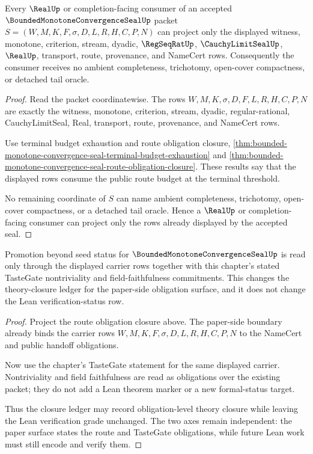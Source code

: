 \begin{theorem}
\label{thm:bounded-monotone-convergence-seal-threshold-route-exhaustion}
Every $\RealUp$ or completion-facing consumer of an accepted $\BoundedMonotoneConvergenceSealUp$ packet $S=(W,M,K,F,\sigma,D,L,R,H,C,P,N)$ can project only the displayed witness, monotone, criterion, stream, dyadic, $\RegSeqRatUp$, $\CauchyLimitSealUp$, $\RealUp$, transport, route, provenance, and NameCert rows. Consequently the consumer receives no ambient completeness, trichotomy, open-cover compactness, or detached tail oracle.
\end{theorem}
\begin{proof}
Read the packet coordinatewise. The rows $W,M,K,\sigma,D,F,L,R,H,C,P,N$ are exactly the witness, monotone, criterion, stream, dyadic, regular-rational, CauchyLimitSeal, Real, transport, route, provenance, and NameCert rows.

Use terminal budget exhaustion and route obligation closure, \autoref{thm:bounded-monotone-convergence-seal-terminal-budget-exhaustion} and \autoref{thm:bounded-monotone-convergence-seal-route-obligation-closure}. These results say that the displayed rows consume the public route budget at the terminal threshold.

No remaining coordinate of $S$ can name ambient completeness, trichotomy, open-cover compactness, or a detached tail oracle. Hence a $\RealUp$ or completion-facing consumer can project only the rows already displayed by the accepted seal.
\end{proof}

\begin{theorem}
\label{thm:bounded-monotone-convergence-seal-tastegate-obligation-boundary}
Promotion beyond seed status for $\BoundedMonotoneConvergenceSealUp$ is read only through the displayed carrier rows together with this chapter's stated TasteGate nontriviality and field-faithfulness commitments. This changes the theory-closure ledger for the paper-side obligation surface, and it does not change the Lean verification-status row.
\end{theorem}
\begin{proof}
Project the route obligation closure above. The paper-side boundary already binds the carrier rows $W,M,K,F,\sigma,D,L,R,H,C,P,N$ to the NameCert and public handoff obligations.

Now use the chapter's TasteGate statement for the same displayed carrier. Nontriviality and field faithfulness are read as obligations over the existing packet; they do not add a Lean theorem marker or a new formal-status target.

Thus the closure ledger may record obligation-level theory closure while leaving the Lean verification grade unchanged. The two axes remain independent: the paper surface states the route and TasteGate obligations, while future Lean work must still encode and verify them.
\end{proof}

